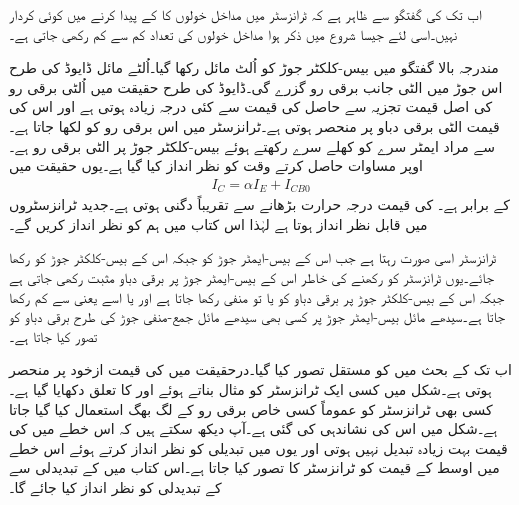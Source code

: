 اب تک کی گفتگو سے ظاہر ہے کہ  ٹرانزسٹر میں مداخل خولوں کا   کے پیدا کرنے میں کوئی کردار نہیں۔اسی لئے جیسا شروع میں ذکر ہوا مداخل خولوں کی تعداد کم سے کم رکھی جاتی ہے۔

مندرجہ بالا گفتگو میں بیس-کلکٹر جوڑ کو اُلٹ مائل رکھا گیا۔اُلٹے مائل ڈایوڈ کی طرح اس جوڑ میں الٹی جانب برقی رو  گزرے گی۔ڈایوڈ کی طرح حقیقت میں اُلٹی برقی رو کی اصل قیمت تجزیہ سے حاصل  کی قیمت سے کئی درجہ زیادہ ہوتی ہے اور اس کی قیمت الٹی برقی دباو پر منحصر ہوتی ہے۔ٹرانزسٹر میں اس برقی رو کو  لکھا جاتا ہے۔  سے مراد ایمٹر سرے کو کھلے سرے رکھتے ہوئے بیس-کلکٹر جوڑ پر الٹی برقی رو ہے۔اوپر مساوات حاصل کرتے وقت   کو نظر انداز کیا گیا ہے۔یوں حقیقت میں
\begin{align}
I_C=\alpha I_E+I_{CB0}
\end{align}
کے برابر ہے۔ کی قیمت درجہ حرارت  بڑھانے سے تقریباً دگنی ہوتی ہے۔جدید ٹرانزسٹروں میں  قابل نظر انداز ہوتا ہے لہٰذا اس کتاب میں ہم  کو نظر انداز کریں گے۔

 ٹرانزسٹر اسی صورت   رہتا ہے جب اس کے بیس-ایمٹر  جوڑ کو  جبکہ اس کے بیس-کلکٹر جوڑ کو  رکھا جائے۔یوں ٹرانزسٹر کو  رکھنے کی خاطر اس کے  بیس-ایمٹر جوڑ پر برقی دباو  مثبت رکھی جاتی ہے جبکہ اس کے بیس-کلکٹر جوڑ پر برقی دباو  کو یا تو منفی رکھا جاتا ہے اور یا اسے  یعنی  سے کم رکھا جاتا ہے۔سیدھے مائل بیس-ایمٹر  جوڑ پر کسی بھی سیدھے مائل جمع-منفی جوڑ کی طرح برقی دباو کو  تصور کیا جاتا ہے۔


اب تک کے بحث میں  کو مستقل تصور کیا گیا۔درحقیقت میں  کی قیمت ازخود  پر منحصر ہوتی ہے۔شکل  میں کسی ایک ٹرانزسٹر کو مثال بناتے ہوئے   اور  کا تعلق دکھایا گیا ہے۔کسی بھی ٹرانزسٹر کو عموماً کسی خاص برقی رو کے لگ بھگ استعمال کیا گیا جاتا ہے۔شکل میں اس کی نشاندہی کی گئی ہے۔آپ دیکھ سکتے ہیں کہ اس خطے میں  کی قیمت بہت زیادہ  تبدیل نہیں ہوتی اور یوں  میں تبدیلی کو نظر انداز کرتے ہوئے  اس خطے میں  اوسط  کے قیمت کو ٹرانزسٹر کا  تصور کیا جاتا  ہے۔اس کتاب میں  کے تبدیدلی سے   کے تبدیدلی کو نظر انداز کیا جائے گا۔ 

